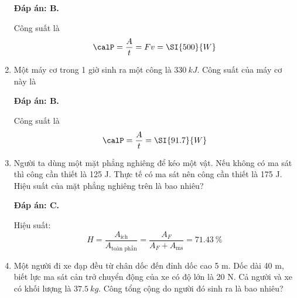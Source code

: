 \begin{enumerate}[label=\bfseries Câu \arabic*:, leftmargin=1.5cm]
{		
	}
	
	\hideall
	{	
		\textbf{Đáp án: B.}
		
		Công suất là
		$$\calP = \dfrac{A}{t} = Fv=\SI{500}{W}$$
	}
	\item {}
	
	
	{
		Một máy cơ trong 1 giờ sinh ra một công là $\SI{330}{kJ}$. Công suất của máy cơ này là
		
	}
	
	\hideall
	{	
		\textbf{Đáp án: B.}
		
		Công suất là
		$$\calP = \dfrac{A}{t} = \SI{91.7}{W}$$
	}
	\item {}
	
	
	{
		Người ta dùng một mặt phẳng nghiêng để kéo một vật. Nếu không có ma sát thì công cần thiết là 125 J. Thực tế có ma sát nên công cần thiết là 175 J. Hiệu suất của mặt phẳng nghiêng trên là bao nhiêu?
		
	}
	
	\hideall
	{	
		\textbf{Đáp án: C.}
		
		Hiệu suất:
		$$H=\dfrac{A_\text{ích}}{A_\text{toàn phần}} = \dfrac{A_F}{A_F + A_\text{ms}} =\SI{71.43}{\%} $$
	}
	\item {}
	
	
	{
		Một người đi xe đạp đều từ chân dốc đến đỉnh dốc cao 5 m. Dốc dài 40 m, biết lực ma sát cản trở chuyển động của xe có độ lớn là 20 N. Cả người và xe có khối lượng là $\SI{37.5}{kg}$. Công tổng cộng do người đó sinh ra là bao nhiêu?
		
}
\end{enumerate}
